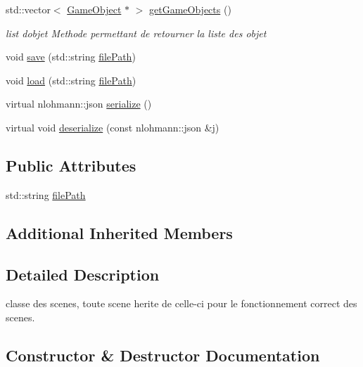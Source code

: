\begin{DoxyCompactItemize}
\item 
std\+::vector$<$ \mbox{\hyperlink{class_beer_engine_1_1_game_object}{Game\+Object}} $\ast$ $>$ \mbox{\hyperlink{class_beer_engine_1_1_a_scene_ae551bf1b3e7cf87cc2de4b6859732e81}{get\+Game\+Objects}} ()
\begin{DoxyCompactList}\small\item\em list d\textquotesingle{}objet Methode permettant de retourner la liste des objet \end{DoxyCompactList}\item 
void \mbox{\hyperlink{class_beer_engine_1_1_a_scene_a65e03ade02de4673cd25544d4843c6d8}{save}} (std\+::string \mbox{\hyperlink{class_beer_engine_1_1_a_scene_a2edf1030b7232a5f703d327976f1d4ea}{file\+Path}})
\item 
void \mbox{\hyperlink{class_beer_engine_1_1_a_scene_aeedbe75eeef457353645d61a68bc2949}{load}} (std\+::string \mbox{\hyperlink{class_beer_engine_1_1_a_scene_a2edf1030b7232a5f703d327976f1d4ea}{file\+Path}})
\item 
virtual nlohmann\+::json \mbox{\hyperlink{class_beer_engine_1_1_a_scene_ae876ec81592c80e7346f05c56bdaa929}{serialize}} ()
\item 
virtual void \mbox{\hyperlink{class_beer_engine_1_1_a_scene_a3db491adb7ff57a3a527024fd0a6001f}{deserialize}} (const nlohmann\+::json \&j)
\end{DoxyCompactItemize}
\subsection*{Public Attributes}
\begin{DoxyCompactItemize}
\item 
std\+::string \mbox{\hyperlink{class_beer_engine_1_1_a_scene_a2edf1030b7232a5f703d327976f1d4ea}{file\+Path}}
\end{DoxyCompactItemize}
\subsection*{Additional Inherited Members}


\subsection{Detailed Description}
classe des scenes, toute scene herite de celle-\/ci pour le fonctionnement correct des scenes. 

\subsection{Constructor \& Destructor Documentation}
\mbox{\label{class_beer_engine_1_1_a_scene_a811f775c81c6d46b267e1926450a7c32}} 
